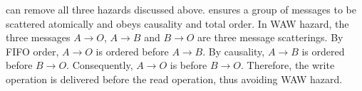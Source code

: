 






\sys can remove all three hazards discussed above.  \sys ensures a group of messages to be scattered atomically and obeys causality and total order.
In WAW hazard, the three messages $A \rightarrow O$, $A \rightarrow B$ and $B \rightarrow O$ are three message scatterings.
By FIFO order, $A \rightarrow O$ is ordered before $A \rightarrow B$. By causality, $A \rightarrow B$ is ordered before $B \rightarrow O$.
Consequently, $A \rightarrow O$ is before $B \rightarrow O$.
Therefore, the write operation is delivered before the read operation, thus avoiding WAW hazard.

